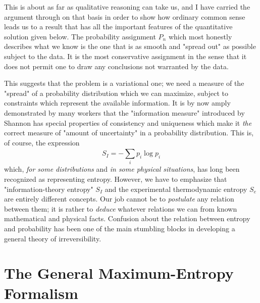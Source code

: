 \documentclass[]{article}
\begin{document}
This is about as far as qualitative reasoning can take us, and I have carried the argument through on that basis in order to show how ordinary common sense leads us to a result that has all the important features of the quantitative solution given below. The probability assignment $P _{ n }$ which most honestly describes what we know is the one that is as smooth and "spread out" as possible subject to the data. It is the most conservative assignment in the sense that it does not permit one to draw any conclusions not warranted by the data.

This suggests that the problem is a variational one; we need a measure of the "spread" of a probability distribution which we can maximize, subject to constraints which represent the available information. It is by now amply demonstrated by many workers that the "information measure" introduced by Shannon\citep{Shannon-mathematical48} has special properties of consistency and uniqueness which make it \emph{the} correct measure of "amount of uncertainty" in a probability distribution. This is, of course, the expression
%
\begin{equation}
S_{I} = - \sum_{i}^{} p_{i}\log p_{i}
\end{equation}
%
which, \emph{for some distributions} and \emph{in some physical situations}, has long been recognized as representing entropy. However, we have to emphasize that "information-theory entropy" $S _{ I }$ and the experimental thermodynamic entropy $S _{e}$ are entirely different concepts. Our job cannot be to \emph{postulate} any relation between them; it is rather to \emph{deduce} whatever relations we can from known mathematical and physical facts. Confusion about the relation between entropy and probability has been one of the main stumbling blocks in developing a general theory of irreversibility.

\section{The General Maximum-Entropy Formalism}\label{the-general-maximum-entropy-formalism}
\end{document}
